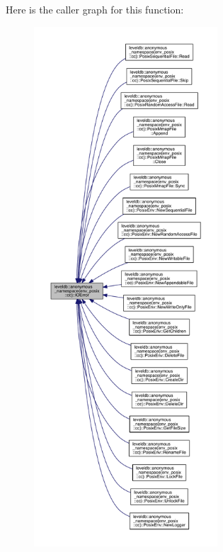 Here is the caller graph for this function\+:
\nopagebreak
\begin{figure}[H]
\begin{center}
\leavevmode
\includegraphics[height=550pt]{namespaceleveldb_1_1anonymous__namespace_02env__posix_8cc_03_a1292cfc7eb1be31555c6d7124519afa1_icgraph}
\end{center}
\end{figure}


\hypertarget{namespaceleveldb_1_1anonymous__namespace_02env__posix_8cc_03_a956300c4adfcbe5ccbbcef79b0a7d8e5}{}
